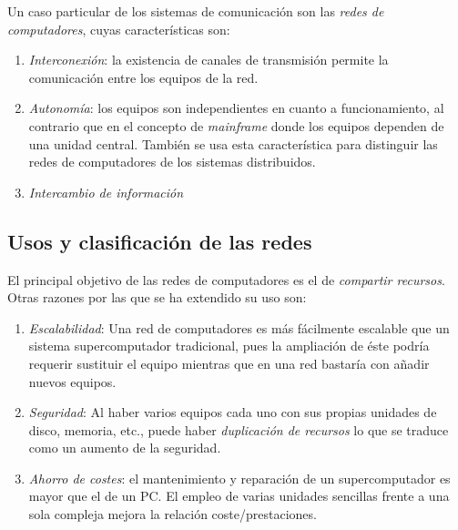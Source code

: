 \documentclass[10pt,a4paper,spanish]{report}
\begin{document}
Un caso particular de los sistemas de comunicación son las \textit{\textcolor{tema1}{redes de computadores}}, cuyas características son:
\begin{enumerate}[\color{tema1}{$\longrightarrow$}]
  \item \textit{\textcolor{tema1}{Interconexión}}: la existencia de canales de transmisión permite la comunicación entre los equipos de la red.
  \item \textit{\textcolor{tema1}{Autonomía}}: los equipos son independientes en cuanto a funcionamiento, al contrario que en el concepto de \textit{\textcolor{tema1}{mainframe}} donde los equipos dependen de una unidad central. También se usa esta característica para distinguir las redes de computadores de los sistemas distribuidos.
  \item \textit{\textcolor{tema1}{Intercambio de información}}
\end{enumerate}

\subsection{\textcolor{tema1}Usos y clasificación de las redes}
El principal objetivo de las redes de computadores es el de \textit{\textcolor{tema1}{compartir recursos}}. Otras razones por las que se ha extendido su uso son:
\begin{enumerate}[\color{tema1}{$\diamondsuit$}]
  \item \textit{\textcolor{tema1}{Escalabilidad}}: Una red de computadores es más fácilmente escalable que un sistema supercomputador tradicional, pues la ampliación de éste podría requerir sustituir el equipo mientras que en una red bastaría con añadir nuevos equipos.
  \item \textit{\textcolor{tema1}{Seguridad}}: Al haber varios equipos cada uno con sus propias unidades de disco, memoria, etc., puede haber \textit{\textcolor{tema1}{duplicación de recursos}} lo que se traduce como un aumento de la seguridad.
  \item \textit{\textcolor{tema1}{Ahorro de costes}}: el mantenimiento y reparación de un supercomputador es mayor que el de un PC. El empleo de varias unidades sencillas frente a una sola compleja mejora la relación coste/prestaciones.
\end{enumerate}
\end{document}
